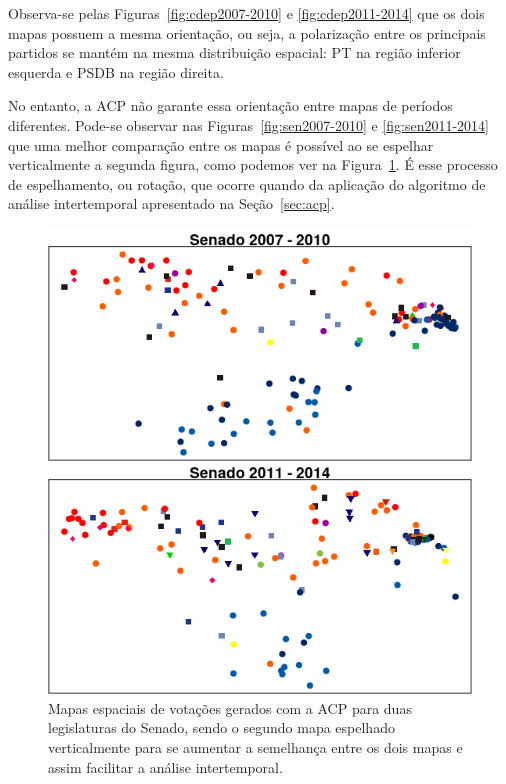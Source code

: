 \documentclass[a4paper, 12pt]{article}
\begin{document}
Observa-se pelas Figuras~\ref{fig:cdep2007-2010} e \ref{fig:cdep2011-2014} que os dois mapas possuem a mesma orientação, ou seja, a polarização entre os principais partidos se mantém na mesma distribuição espacial: PT na região inferior esquerda e PSDB na região direita. 

No entanto, a ACP não garante essa orientação entre mapas de períodos diferentes. Pode-se observar nas Figuras~\ref{fig:sen2007-2010} e \ref{fig:sen2011-2014} que uma melhor comparação entre os mapas é possível ao se espelhar verticalmente a segunda figura, como podemos ver na Figura~\ref{fig:sen-rotacao}. É esse processo de espelhamento, ou rotação, que ocorre quando da aplicação do algoritmo de análise intertemporal apresentado na Seção~\ref{sec:acp}.

\begin{figure}[h!]
  \centering
  \includegraphics[scale=0.7]{figs/sen-rotacao.png}
  \caption{Mapas espaciais de votações gerados com a ACP para duas legislaturas do Senado, sendo o segundo mapa espelhado verticalmente para se aumentar a semelhança entre os dois mapas e assim facilitar a análise intertemporal.}
  \label{fig:sen-rotacao}
\end{figure}
\end{document}
